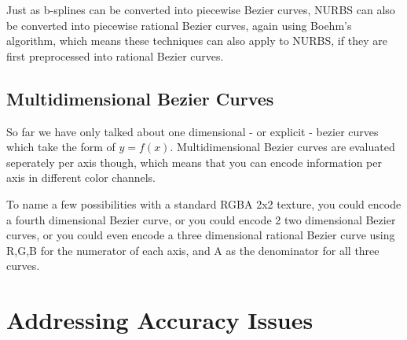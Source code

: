 \documentclass{jcgt}
\begin{document}
Just as b-splines can be converted into piecewise Bezier curves, NURBS can also be converted into piecewise rational Bezier curves, again using Boehm's algorithm, which means these techniques can also apply to NURBS, if they are first preprocessed into rational Bezier curves.

\subsection{Multidimensional Bezier Curves}

So far we have only talked about one dimensional - or explicit - bezier curves which take the form of $y=f(x)$.  Multidimensional Bezier curves are evaluated seperately per axis though, which means that you can encode information per axis in different color channels.

To name a few possibilities with a standard RGBA 2x2 texture, you could encode a fourth dimensional Bezier curve, or you could encode 2 two dimensional Bezier curves, or you could even encode a three dimensional rational Bezier curve using R,G,B for the numerator of each axis, and A as the denominator for all three curves.

\section{Addressing Accuracy Issues}
\label{sec:addressingaccuracyissues}
\end{document}
